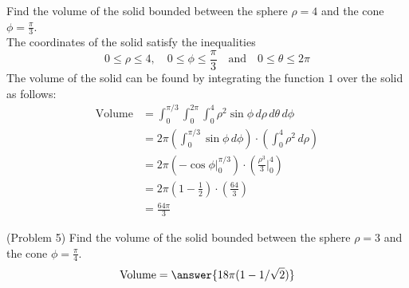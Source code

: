 \documentclass[handout]{ximera}
\begin{document}
\begin{example}[Example 5]
Find the volume of the solid bounded between the sphere $\rho = 4$ and the cone $\phi = \frac{\pi}{3}$.\\
The coordinates of the solid satisfy the inequalities
\[
0 \leq \rho \leq 4, \quad 0 \leq \phi \leq \frac{\pi}{3} \quad \text{and} \quad 0\leq \theta \leq 2\pi
\]
The volume of the solid can be found by integrating the function $1$ over the solid as follows:
\begin{align*}
\text{Volume} &= \int_0^{\pi/3} \int_0^{2\pi}  \int_0^4 \rho^2 \sin \phi \, d\rho\, d\theta\, d\phi\\
              &= 2\pi \left(\int_0^{\pi/3} \sin \phi \, d\phi\right) \cdot \left( \int_0^4 \rho^2 \, d\rho\right) \\
              &= 2\pi \left( -\cos \phi \bigg|_0^{\pi/3} \right) \cdot \left( \frac{\rho^3}{3}\bigg|_0^4\right)\\
              &= 2\pi \left(1 - \frac12\right) \cdot \left( \frac{64}{3}\right)\\
              &= \frac{64\pi}{3}
\end{align*}

\begin{image}
\end{image}

\end{example}

\begin{problem}(Problem 5)
Find the volume of the solid bounded between the sphere $\rho = 3$ and the cone $\phi = \frac{\pi}{4}$.\\
\[
\text{Volume}= \answer{18\pi(1 - 1/\sqrt 2)}
\]
\end{problem}  
                      
\end{document}
